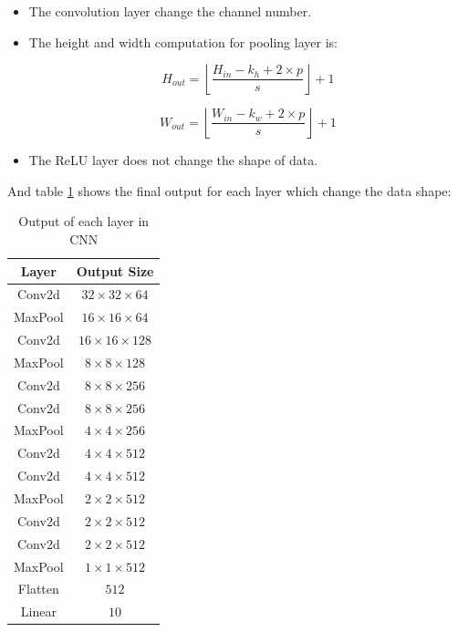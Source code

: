 \documentclass{article}
\begin{document}
\begin{itemize}
    \item The convolution layer change the channel number.

    \item {
        The height and width computation for pooling layer is:

        $$ H_{out} = \left\lfloor \frac{H_{in} - k_{h} + 2 \times p}{s} \right\rfloor + 1 $$
        
        $$ W_{out} = \left\lfloor \frac{W_{in} - k_{w} + 2 \times p}{s} \right\rfloor + 1 $$
        }
        
    \item The ReLU layer does not change the shape of  data.
\end{itemize}

And table \ref{tab:network_layers} shows the final output for each layer which change the data shape:

\begin{table}[!ht]
\centering\caption{Output of each layer in CNN}
\label{tab:network_layers}
\begin{tabular}{|c|c|}
\hline
\textbf{Layer} & \textbf{Output Size} \\
\hline
Conv2d & $32 \times 32 \times 64$ \\ \hline
MaxPool & $16 \times 16 \times 64$ \\ \hline
Conv2d & $16 \times 16 \times 128$ \\ \hline
MaxPool & $8 \times 8 \times 128$ \\ \hline
Conv2d & $8 \times 8 \times 256$ \\ \hline
Conv2d & $8 \times 8 \times 256$ \\ \hline
MaxPool & $4 \times 4 \times 256$ \\ \hline
Conv2d & $4 \times 4 \times 512$ \\ \hline
Conv2d & $4 \times 4 \times 512$ \\ \hline
MaxPool & $2 \times 2 \times 512$ \\ \hline
Conv2d & $2 \times 2 \times 512$ \\ \hline
Conv2d & $2 \times 2 \times 512$ \\ \hline
MaxPool & $1 \times 1 \times 512$ \\ \hline
Flatten & $512$ \\ \hline
Linear & $10$ \\ \hline
\end{tabular}
\end{table}
\end{document}
